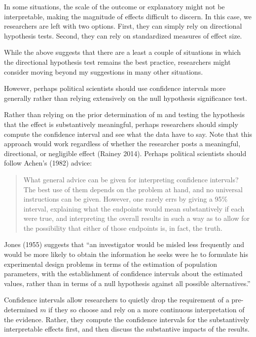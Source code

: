 \documentclass[12pt]{article}
\begin{document}
In some situations, the scale of the outcome or explanatory might not be interpretable, making the magnitude of effects difficult to discern. In this case, we researchers are left with two options. First, they can simply rely on directional hypothesis tests. Second, they can rely on standardized measures of effect size.


While the above suggests that there are a least a couple of situations in which the directional hypothesis test remains the best practice, researchers might consider moving beyond my suggestions in many other situations. 

However, perhaps political scientists should use confidence intervals more generally rather than relying extensively on the null hypothesis significance test.

Rather than relying on the prior determination of m and testing the hypothesis that the effect is substantively meaningful, perhaps researchers should simply compute the confidence interval and see what the data have to say. Note that this approach would work regardless of whether the researcher posts a meaningful, directional, or negligible effect (Rainey 2014). Perhaps political scientists should follow Achen's (1982) advice:

\begin{quote}
What general advice can be given for interpreting confidence intervals? The best use of them depends on the problem at hand, and no universal instructions can be given. However, one rarely errs by giving a 95\% interval, explaining what the endpoints would mean substantively if each were true, and interpreting the overall results in such a way as to allow for the possibility that either of those endpoints is, in fact, the truth.
\end{quote}

Jones (1955) suggests that ``an investigator would be misled less frequently and would be more likely to obtain the information he seeks were he to formulate his experimental design problems in terms of the estimation of population parameters, with the establishment of confidence intervals about the estimated values, rather than in terms of a null hypothesis against all possible alternatives.''

Confidence intervals allow researchers to quietly drop the requirement of a pre-determined $m$ if they so choose and rely on a more continuous interpretation of the evidence. Rather, they compute the confidence intervals for the substantively interpretable effects first, and then discuss the substantive impacts of the results.
\end{document}
